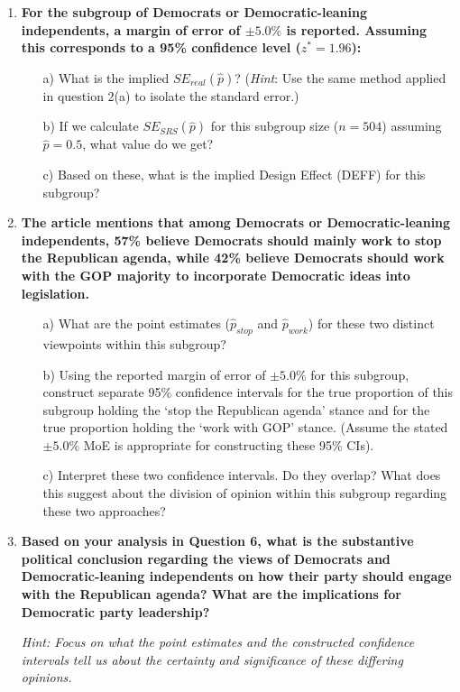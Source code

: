 \documentclass[12pt]{article}
\begin{document}
\begin{enumerate}
    \item \textbf{For the subgroup of Democrats or Democratic-leaning independents, a margin of error of $\pm 5.0\%$ is reported. Assuming this corresponds to a 95\% confidence level ($z^* = 1.96$):}
    \begin{itemize}
        \item[a)] What is the implied $SE_{real}(\hat{p})$? (\emph{Hint}: Use the same method applied in question 2(a) to isolate the standard error.)
        \item[b)] If we calculate $SE_{SRS}(\hat{p})$ for this subgroup size ($n=504$) assuming $\hat{p}=0.5$, what value do we get?
        \item[c)] Based on these, what is the implied Design Effect (DEFF) for this subgroup?
    \end{itemize}

    \item \textbf{The article mentions that among Democrats or Democratic-leaning independents, 57\% believe Democrats should mainly work to stop the Republican agenda, while 42\% believe Democrats should work with the GOP majority to incorporate Democratic ideas into legislation.}
    \begin{itemize}
        \item[a)] What are the point estimates ($\hat{p}_{stop}$ and $\hat{p}_{work}$) for these two distinct viewpoints within this subgroup?
        \item[b)] Using the reported margin of error of $\pm 5.0\%$ for this subgroup, construct separate 95\% confidence intervals for the true proportion of this subgroup holding the `stop the Republican agenda' stance and for the true proportion holding the `work with GOP' stance. (Assume the stated $\pm 5.0\%$ MoE is appropriate for constructing these 95\% CIs).
        \item[c)] Interpret these two confidence intervals. Do they overlap? What does this suggest about the division of opinion within this subgroup regarding these two approaches?
    \end{itemize}

    \item \textbf{Based on your analysis in Question 6, what is the substantive political conclusion regarding the views of Democrats and Democratic-leaning independents on how their party should engage with the Republican agenda? What are the implications for Democratic party leadership?}

    \textit{Hint: Focus on what the point estimates and the constructed confidence intervals tell us about the certainty and significance of these differing opinions.}
\end{enumerate}
\end{document}
